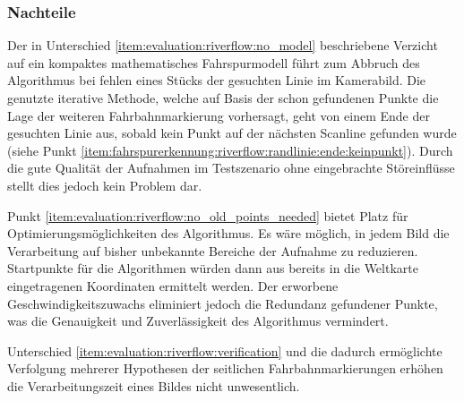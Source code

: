 \subsubsection{Nachteile}
Der in Unterschied \ref{item:evaluation:riverflow:no_model} beschriebene Verzicht auf ein kompaktes mathematisches Fahrspurmodell führt zum Abbruch des Algorithmus bei fehlen eines Stücks der gesuchten Linie im Kamerabild. Die genutzte iterative Methode, welche auf Basis der schon gefundenen Punkte die Lage der weiteren Fahrbahnmarkierung vorhersagt, geht von einem Ende der gesuchten Linie aus, sobald kein Punkt auf der nächsten Scanline gefunden wurde (siehe Punkt \ref{item:fahrspurerkennung:riverflow:randlinie:ende:keinpunkt}). Durch die gute Qualität der Aufnahmen im Testszenario ohne eingebrachte Störeinflüsse stellt dies jedoch kein  Problem dar.

Punkt \ref{item:evaluation:riverflow:no_old_points_needed} bietet Platz für Optimierungsmöglichkeiten des Algorithmus. Es wäre möglich, in jedem Bild die Verarbeitung auf bisher unbekannte Bereiche der Aufnahme zu reduzieren. Startpunkte für die Algorithmen würden dann aus bereits in die Weltkarte eingetragenen Koordinaten ermittelt werden. Der erworbene Geschwindigkeitszuwachs eliminiert jedoch die Redundanz gefundener Punkte, was die Genauigkeit und Zuverlässigkeit des Algorithmus vermindert.

Unterschied \ref{item:evaluation:riverflow:verification} und die dadurch ermöglichte Verfolgung mehrerer Hypothesen der seitlichen Fahrbahnmarkierungen erhöhen die Verarbeitungszeit eines Bildes nicht unwesentlich.
